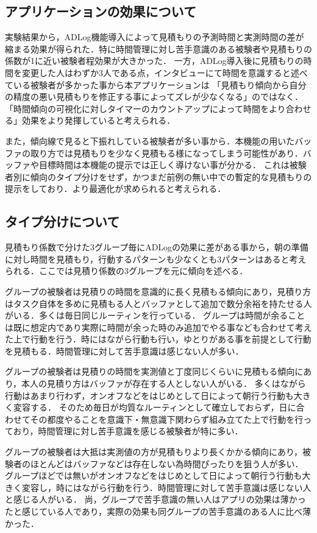\subsection{アプリケーションの効果について}
実験結果から，ADLog機能導入によって見積もりの予測時間と実測時間の差が縮まる効果が得られた．特に時間管理に対し苦手意識のある被験者や見積もりの係数が1に近い被験者程効果が大きかった．
一方，ADLog導入後に見積もりの時間を変更した人はわずか3人である点，インタビューにて時間を意識すると述べている被験者が多かった事から本アプリケーションは
「見積もり傾向から自分の精度の悪い見積もりを修正する事によってズレが少なくなる」のではなく．「時間傾向の可視化に対しタイマーのカウントアップによって時間をより合わせる」効果をより発揮していると考えられる．

また，傾向線で見ると下振れしている被験者が多い事から．本機能の用いたバッファの取り方では見積もりを少なく見積もる様になってしまう可能性があり．バッファや目標時間は本機能の提示では正しく導けない事が分かる．
これは被験者別に傾向のタイプ分けをせず，かつまだ前例の無い中での暫定的な見積もりの提示をしており．より最適化が求められると考えられる．

\subsection{タイプ分けについて}
見積もり係数で分けた3グループ毎にADLogの効果に差がある事から，朝の準備に対し時間を見積もり，行動するパターンも少なくとも3パターンはあると考えられる．ここでは見積り係数の3グループを元に傾向を述べる．

グループの被験者は見積りの時間を意識的に長く見積もる傾向にあり，見積り方はタスク自体を多めに見積もる人とバッファとして追加で数分余裕を持たせる人がいる．多くは毎日同じルーティンを行っている．
グループは時間が余ることは既に想定内であり実際に時間が余った時のみ追加でやる事なども合わせて考えた上で行動を行う．時にはながら行動も行い，ゆとりがある事を前提として行動を見積もる．時間管理に対して苦手意識は感じない人が多い．

グループの被験者は見積りの時間を実測値と丁度同じくらいに見積もる傾向にあり，本人の見積り方はバッファが存在する人としない人がいる．
多くはながら行動はあまり行わず，オンオフなどをはじめとして日によって朝行う行動も大きく変容する．
そのため毎日が均質なルーティンとして確立しておらず，日に合わせてその都度やることを意識下・無意識下関わらず組み立てた上で行動を行っており，時間管理に対し苦手意識を感じる被験者が特に多い．

グループの被験者は大抵は実測値の方が見積もりより長くかかる傾向にあり，被験者のほとんどはバッファなどは存在しない為時間ぴったりを狙う人が多い．
グループほどでは無いがオンオフなどをはじめとして日によって朝行う行動も大きく変容し，時にはながら行動を行う．時間管理に対して苦手意識は感じない人と感じる人がいる．
尚，グループで苦手意識の無い人はアプリの効果は薄かったと感じている人であり，実際の効果も同グループの苦手意識のある人に比べ薄かった．

